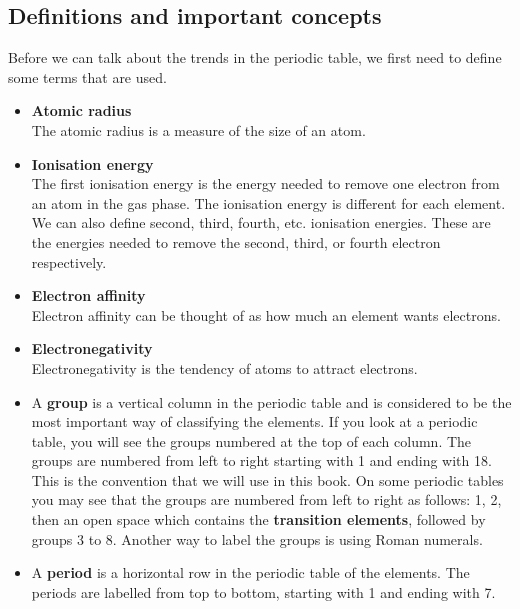 \subsection*{Definitions and important concepts}
Before we can talk about the trends in the periodic table, we first need to define some terms that are used. 
\begin{itemize}
\item \textbf{Atomic radius} \\
The atomic radius is a measure of the size of an atom. 
\item \textbf{Ionisation energy}\\
The first ionisation energy is the energy needed to remove one electron from an atom in the gas phase. The ionisation energy is different for each element. We can also define second, third, fourth, etc. ionisation energies. These are the energies needed to remove the second, third, or fourth electron respectively. 
\item \textbf{Electron affinity}\\
Electron affinity can be thought of as how much an element wants electrons.
\item \textbf{Electronegativity}\\
Electronegativity is the tendency of atoms to attract electrons.
\item A \textbf{group} is a vertical column in the periodic table and is considered to be the most important way of classifying the elements. If you look at a periodic table, you will see the groups numbered at the top of each column. The groups are numbered from left to right starting with 1 and ending with 18. This is the convention that we will use in this book. On some periodic tables you may see that the groups are numbered from left to right  as follows: 1, 2, then an open space which contains the \textbf{transition elements}, followed by groups 3 to 8. Another way to label the groups is using Roman numerals.
\item A \textbf{period} is a horizontal row in the periodic table of the elements. The periods are labelled from top to bottom, starting with 1 and ending with 7.
\end{itemize}


      \label{m38760*uid146}
